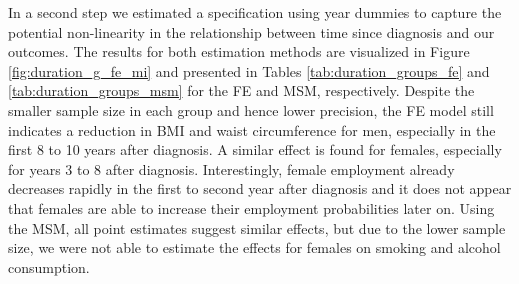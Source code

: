\FloatBarrier

In a second step we estimated a specification using year dummies to capture the potential non-linearity in the relationship between time since diagnosis and our outcomes. The results for both estimation methods are visualized in Figure \ref{fig:duration_g_fe_mi} and presented in Tables \ref{tab:duration_groups_fe} and \ref{tab:duration_groups_msm} for the \ac{FE} and \ac{MSM}, respectively. Despite the smaller sample size in each group and hence lower precision, the \ac{FE} model still indicates a reduction in \ac{BMI} and waist circumference for men, especially in the first 8 to 10 years after diagnosis. A similar effect is found for females, especially for years 3 to 8 after diagnosis. Interestingly, female employment already decreases rapidly in the first to second year after diagnosis and it does not appear that females are able to increase their employment probabilities later on. Using the \ac{MSM}, all point estimates suggest similar effects, but due to the lower sample size, we were not able to estimate the effects for females on smoking and alcohol consumption.


